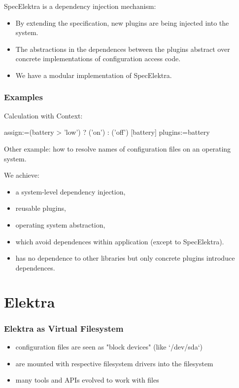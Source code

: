\begin{frame}
	SpecElektra is a dependency injection mechanism:

	\begin{itemize}[<+->]
	\item By extending the specification, new plugins are being injected into the system.
	\item The  abstractions in the dependences between the plugins abstract over concrete implementations of configuration access code.
	\item We have a modular implementation of SpecElektra.
	\end{itemize}
\end{frame}

\begin{frame}[fragile]
	\frametitle{Examples}
	Calculation with Context:
	\pause
	\begin{code}
	assign:=(battery > 'low') ? ('on') : ('off')
	[battery]
	plugins:=battery
	\end{code}

	Other example: how to resolve names of configuration files on an operating system.
\end{frame}

\begin{frame}
	We achieve:

	\begin{itemize}[<+->]
	\item a system-level dependency injection,
	\item reusable plugins,
	\item operating system abstraction,
	\item which avoid dependences within application (except to SpecElektra).
	\item \elektra{} has no dependence to other libraries but only concrete plugins introduce dependences.
	\end{itemize}
\end{frame}



\section{Elektra}


\begin{frame}
	\frametitle{Elektra as Virtual Filesystem}
	\begin{itemize}
	\item configuration files are seen as "block devices" (like `/dev/sda`)
	\item are mounted with respective filesystem drivers into the filesystem
	\item many tools and APIs evolved to work with files
	\end{itemize}
\end{frame}


